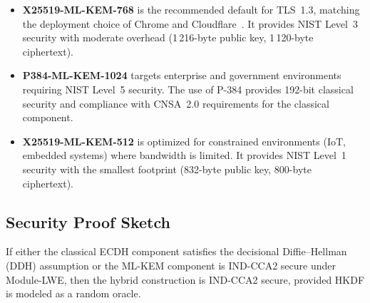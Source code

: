\documentclass[conference,10pt]{IEEEtran}
\begin{document}
\begin{itemize}[leftmargin=*]
\item \textbf{X25519-ML-KEM-768} is the recommended default for TLS~1.3,
  matching the deployment choice of Chrome and Cloudflare~\cite{cloudflare-pq,
  chrome-pq}. It provides NIST Level~3 security with moderate overhead
  (1\,216-byte public key, 1\,120-byte ciphertext).

\item \textbf{P384-ML-KEM-1024} targets enterprise and government
  environments requiring NIST Level~5 security. The use of P-384
  provides 192-bit classical security and compliance with CNSA~2.0
  requirements for the classical component.

\item \textbf{X25519-ML-KEM-512} is optimized for constrained
  environments (IoT, embedded systems) where bandwidth is limited. It
  provides NIST Level~1 security with the smallest footprint (832-byte
  public key, 800-byte ciphertext).
\end{itemize}

\subsection{Security Proof Sketch}

\begin{theorem}
If either the classical ECDH component satisfies the decisional
Diffie--Hellman (DDH) assumption or the ML-KEM component is IND-CCA2
secure under Module-LWE, then the hybrid construction is IND-CCA2
secure, provided HKDF is modeled as a random oracle.
\end{theorem}
\end{document}
